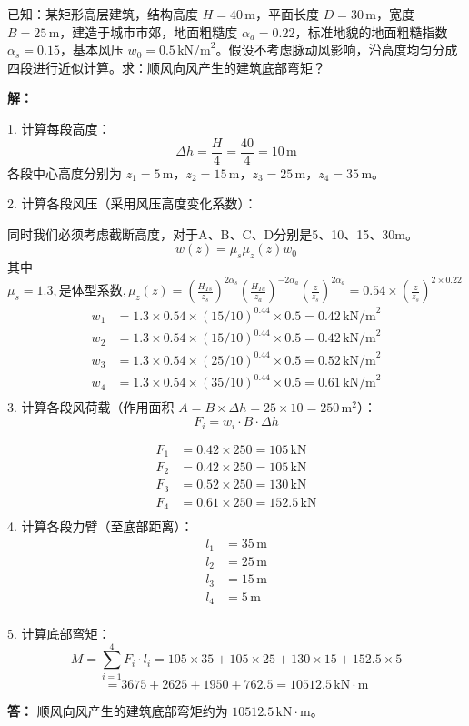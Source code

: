 \documentclass[12pt, a4paper, oneside, UTF8]{ctexbook}
\begin{document}
\begin{example}
    已知：某矩形高层建筑，结构高度 $H=40\,\mathrm{m}$，平面长度 $D=30\,\mathrm{m}$，宽度 $B=25\,\mathrm{m}$，建造于城市市郊，地面粗糙度 $\alpha_a=0.22$，标准地貌的地面粗糙指数 $\alpha_s=0.15$，基本风压 $w_0=0.5\,\mathrm{kN/m}^2$。假设不考虑脉动风影响，沿高度均匀分成四段进行近似计算。求：顺风向风产生的建筑底部弯矩？

    \textbf{解：}

    1. 计算每段高度：
    \[
    \Delta h = \frac{H}{4} = \frac{40}{4} = 10\,\mathrm{m}
    \]
    各段中心高度分别为 $z_1=5\,\mathrm{m}$，$z_2=15\,\mathrm{m}$，$z_3=25\,\mathrm{m}$，$z_4=35\,\mathrm{m}$。

    2. 计算各段风压（采用风压高度变化系数）：

    同时我们必须考虑截断高度，对于A、B、C、D分别是5、10、15、30m。
    \[
    w(z) = \mu_s \mu_z(z) w_0
    \]
    其中 $\mu_s = 1.3 ,\text{是体型系数},\mu_z(z)=\left( \frac{H_{Ts}}{z_s} \right)^{2\alpha_s} \left( \frac{H_{Ta}}{z_a} \right)^{-2\alpha_a} \left( \frac{z}{z_s} \right)^{2\alpha_a} = 0.54 \times (\frac{z}{z_s})^{2 \times 0.22}$
    \begin{align*}
    w_1 &= 1.3 \times 0.54 \times (15/10)^{0.44} \times 0.5 = 0.42\,\mathrm{kN/m}^2 \\
    w_2 &= 1.3 \times 0.54 \times (15/10)^{0.44} \times 0.5 = 0.42\,\mathrm{kN/m}^2 \\
    w_3 &= 1.3 \times 0.54 \times (25/10)^{0.44} \times 0.5 = 0.52\,\mathrm{kN/m}^2 \\
    w_4 &= 1.3 \times 0.54 \times (35/10)^{0.44} \times 0.5 = 0.61\,\mathrm{kN/m}^2 \\
    \end{align*}
    3. 计算各段风荷载（作用面积 $A = B \times \Delta h = 25 \times 10 = 250\,\mathrm{m}^2$）：
    \[
    F_i = w_i \cdot B \cdot \Delta h
    \]

    \begin{align*}
    F_1 &= 0.42 \times 250 = 105\,\mathrm{kN} \\
    F_2 &= 0.42 \times 250 = 105\,\mathrm{kN} \\
    F_3 &= 0.52 \times 250 = 130\,\mathrm{kN} \\
    F_4 &= 0.61 \times 250 = 152.5\,\mathrm{kN} \\
    \end{align*}
    4. 计算各段力臂（至底部距离）：
    \begin{align*}
    l_1 &= 35\,\mathrm{m} \\
    l_2 &= 25\,\mathrm{m} \\
    l_3 &= 15\,\mathrm{m} \\
    l_4 &= 5\,\mathrm{m} \\
    \end{align*}

    5. 计算底部弯矩：
    \[
    M = \sum_{i=1}^{4} F_i \cdot l_i = 105 \times 35 + 105 \times 25 + 130 \times 15 + 152.5 \times 5
    \]
    \[
    = 3675 + 2625 + 1950 + 762.5 = 10512.5\,\mathrm{kN \cdot m}
    \]

    \textbf{答：} 顺风向风产生的建筑底部弯矩约为 $10512.5\,\mathrm{kN \cdot m}$。

\end{example}
\end{document}

